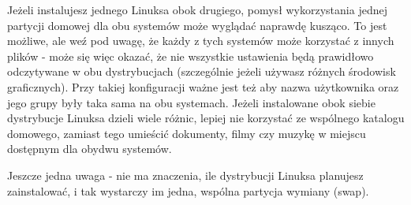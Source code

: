 Jeżeli instalujesz jednego Linuksa obok drugiego, pomysł wykorzystania jednej partycji domowej dla obu systemów może wyglądać naprawdę kusząco. To jest możliwe, ale weź pod uwagę, że każdy z tych systemów może korzystać z innych plików - może się więc okazać, że nie wszystkie ustawienia będą prawidłowo odczytywane w obu dystrybucjach (szczególnie jeżeli używasz różnych środowisk graficznych). Przy takiej konfiguracji ważne jest też aby nazwa użytkownika oraz jego grupy były taka sama na obu systemach. Jeżeli instalowane obok siebie dystrybucje Linuksa dzieli wiele różnic, lepiej nie korzystać ze wspólnego katalogu domowego, zamiast tego umieścić dokumenty, filmy czy muzykę w miejscu dostępnym dla obydwu systemów.

Jeszcze jedna uwaga - nie ma znaczenia, ile dystrybucji Linuksa planujesz zainstalować, i tak wystarczy im jedna, wspólna partycja wymiany (swap).